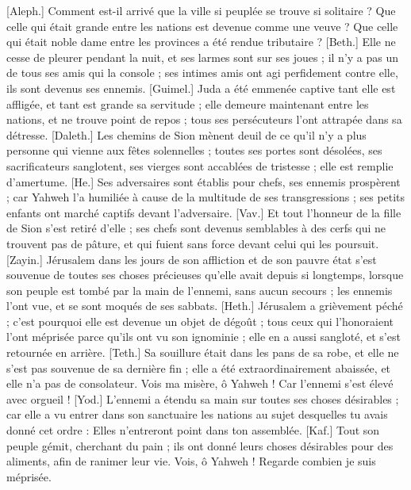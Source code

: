 \begin{multicols}{2}
\VerseOne{}[Aleph.] Comment est-il arrivé que la ville si peuplée se trouve si solitaire ? Que celle qui était grande entre les nations est devenue comme une veuve ? Que celle qui était noble dame entre les provinces a été rendue tributaire ?
[Beth.] Elle ne cesse de pleurer pendant la nuit, et ses larmes sont sur ses joues ; il n'y a pas un de tous ses amis qui la console ; ses intimes amis ont agi perfidement contre elle, ils sont devenus ses ennemis.
[Guimel.] Juda a été emmenée captive tant elle est affligée, et tant est grande sa servitude ; elle demeure maintenant entre les nations, et ne trouve point de repos ; tous ses persécuteurs l'ont attrapée dans sa détresse.
[Daleth.] Les chemins de Sion mènent deuil de ce qu'il n'y a plus personne qui vienne aux fêtes solennelles ; toutes ses portes sont désolées, ses sacrificateurs sanglotent, ses vierges sont accablées de tristesse ; elle est remplie d'amertume. 
[He.] Ses adversaires sont établis pour chefs, ses ennemis prospèrent ; car Yahweh l'a humiliée à cause de la multitude de ses transgressions ; ses petits enfants ont marché captifs devant l'adversaire.
[Vav.] Et tout l'honneur de la fille de Sion s'est retiré d'elle ; ses chefs sont devenus semblables à des cerfs qui ne trouvent pas de pâture, et qui fuient sans force devant celui qui les poursuit.
[Zayin.] Jérusalem dans les jours de son affliction et de son pauvre état s'est souvenue de toutes ses choses précieuses qu'elle avait depuis si longtemps, lorsque son peuple est tombé par la main de l'ennemi, sans aucun secours ; les ennemis l'ont vue, et se sont moqués de ses sabbats.
[Heth.] Jérusalem a grièvement péché ; c'est pourquoi elle est devenue un objet de dégoût ; tous ceux qui l'honoraient l'ont méprisée parce qu'ils ont vu son ignominie ; elle en a aussi sangloté, et s'est retournée en arrière.
[Teth.] Sa souillure était dans les pans de sa robe, et elle ne s'est pas souvenue de sa dernière fin ; elle a été extraordinairement abaissée, et elle n'a pas de consolateur. Vois ma misère, ô Yahweh ! Car l'ennemi s'est élevé avec orgueil !
[Yod.] L'ennemi a étendu sa main sur toutes ses choses désirables ; car elle a vu entrer dans son sanctuaire les nations au sujet desquelles tu avais donné cet ordre : Elles n'entreront point dans ton assemblée.
[Kaf.] Tout son peuple gémit, cherchant du pain ; ils ont donné leurs choses désirables pour des aliments, afin de ranimer leur vie. Vois, ô Yahweh ! Regarde combien je suis méprisée.

\end{multicols}
